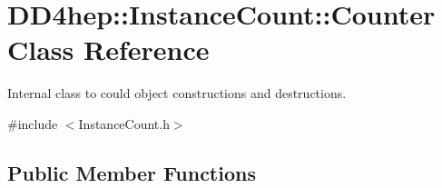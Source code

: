 \hypertarget{class_d_d4hep_1_1_instance_count_1_1_counter}{}\section{D\+D4hep\+:\+:Instance\+Count\+:\+:Counter Class Reference}
\label{class_d_d4hep_1_1_instance_count_1_1_counter}


Internal class to could object constructions and destructions.  




{\ttfamily \#include $<$Instance\+Count.\+h$>$}

\subsection*{Public Member Functions}
